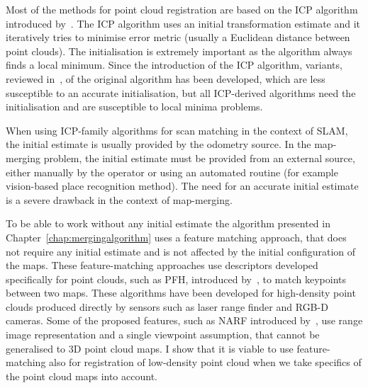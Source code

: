 Most of the methods for point cloud registration are based on the \gls{ICP} algorithm introduced by~\citet{besl1992icp}. The \gls{ICP} algorithm uses an initial transformation estimate and it iteratively tries to minimise error metric (usually a Euclidean distance between point clouds). The initialisation is extremely important as the algorithm always finds a local minimum. Since the introduction of the \gls{ICP} algorithm, variants, reviewed in~\citet{pomerleau2015reviewregistration}, of the original algorithm has been developed, which are less susceptible to an accurate initialisation, but all \gls{ICP}-derived algorithms need the initialisation and are susceptible to local minima problems.

When using \gls{ICP}-family algorithms for scan matching in the context of \gls{SLAM}, the initial estimate is usually provided by the odometry source. In the map-merging problem, the initial estimate must be provided from an external source, either manually by the operator or using an automated routine (for example vision-based place recognition method). The need for an accurate initial estimate is a severe drawback in the context of map-merging.

To be able to work without any initial estimate the algorithm presented in Chapter~\ref{chap:mergingalgorithm} uses a feature matching approach, that does not require any initial estimate and is not affected by the initial configuration of the maps. These feature-matching approaches use descriptors developed specifically for point clouds, such as \gls{PFH}, introduced by~\citet{rusu2008pfh}, to match keypoints between two maps. These algorithms have been developed for high-density point clouds produced directly by sensors such as laser range finder and \gls{RGB-D} cameras. Some of the proposed features, such as \gls{NARF} introduced by~\citet{steder2010narf}, use range image representation and a single viewpoint assumption, that cannot be generalised to \gls{3D} point cloud maps. I show that it is viable to use feature-matching also for registration of low-density point cloud when we take specifics of the point cloud maps into account.
